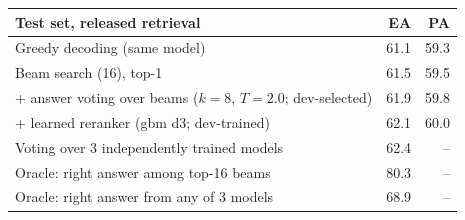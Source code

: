 \begin{tabular}{lrr}
\toprule
Test set, released retrieval & EA & PA \\
\midrule
Greedy decoding (same model) & 61.1 & 59.3 \\
Beam search (16), top-1 & 61.5 & 59.5 \\
+ answer voting over beams ($k{=}8$, $T{=}2.0$; dev-selected) & 61.9 & 59.8 \\
+ learned reranker (gbm d3; dev-trained) & 62.1 & 60.0 \\
\midrule
Voting over 3 independently trained models & 62.4 & -- \\
Oracle: right answer among top-16 beams & 80.3 & -- \\
Oracle: right answer from any of 3 models & 68.9 & -- \\
\bottomrule
\end{tabular}
